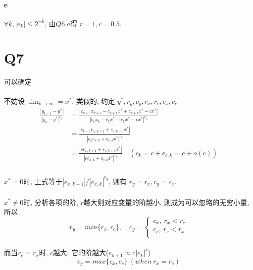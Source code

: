 \documentclass{article}
\begin{document}
\begin{CJK}{UTF8}{gbsn}
  \paragraph{e}
    $\forall k, |e_k| \leq 2^{-k}$, 由$Q6.a$得 $r = 1, c = 0.5$.

\section{Q7}
  可以确定
  \paragraph{}
  不妨设 $\lim_{k \to \infty} = x^*$, 类似的, 约定 $y^*, r_y, c_y, r_x, r_c, c_x, c_c$
  \begin{equation}
    \begin{aligned}
      \frac{|y_{k + 1} - y^*|}{|y_k - y^*|^{r_y}} & = \frac{|c_{k + 1}x_{k + 1} - c_{k + 1}x^* + c_{k + 1}x^* - cx^*|}{|c_{k}x_{k} - c_{k}x^* + c_{k}x^* - cx^*|^{r_y}} \\
      & = \frac{|c_{k + 1}e_{x, k + 1} + e_{c, k + 1}x^*|}{|c_{k}e_{x, k} + e_{c, k}x^*|^{r_y}} \\
      & = \frac{|ce_{x, k + 1} + e_{c, k + 1}x^*|}{|ce_{x, k} + e_{c, k}x^*|^{r_y}} \quad (c_k = c + e_{c, k} = c + o(c)) \\
    \end{aligned}
  \end{equation}
  \paragraph{}
    $x^* = 0$时, 上式等于$|e_{x, k + 1}| / |e_{x, k}|^{r_y}$, 则有 $r_y = r_x, c_y = c_x$.
  \paragraph{}
    $x^* \not= 0$时, 分析各项的阶, $r$越大则对应变量的阶越小, 则成为可以忽略的无穷小量, 所以
    \begin{equation}
      r_y = min\{r_x, r_c\},\quad c_y =
      \begin{cases}
        c_x,\ r_x < r_c \\
        c_c,\ r_c < r_x \\
      \end{cases}
    \end{equation}
  \paragraph{}
  而当$r_c = r_x$时, $c$越大, 它的阶越大($e_{k + 1} \approx c|e_{k}|^r$)
  \begin{equation}
    c_y = max\{c_x, c_c\}\ (when\ r_x = r_c)
  \end{equation}

\end{CJK}
\end{document}
